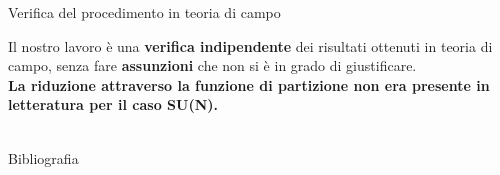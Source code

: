 \documentclass[10pt,compress,usenames,dvipsnames]{beamer}
\begin{document}
\begin{frame}{Verifica del procedimento in teoria di campo}
\begin{center}
{\large   
Il nostro lavoro è una \alert{\bfseries verifica indipendente} dei risultati ottenuti in teoria di campo, senza fare \alert{\bfseries assunzioni} che non si è in grado di giustificare.
\\[0.3cm]
{\alert{\bfseries La riduzione attraverso la funzione di partizione non era presente in letteratura per il caso SU(N).}
}
} 
\\
\vspace{0.5cm}
\\
\end{center}



\end{frame}



\begin{frame}{Bibliografia}
\nocite{*}
{ \footnotesize

}
\end{frame}
\end{document}
